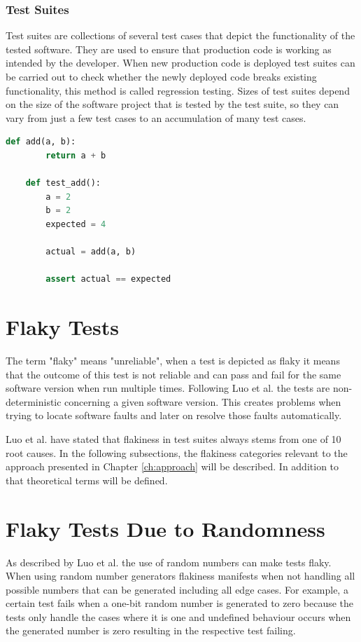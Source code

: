 \documentclass[
fancyheadings, %
%
%
]{stsreprt}
\begin{document}
\subsubsection{Test Suites}
Test suites are collections of several test cases that depict the functionality of the tested software. They are used to ensure that production code is working as intended by the developer. When new production code is deployed test suites can be carried out to check whether the newly deployed code breaks existing functionality, this method is called regression testing. Sizes of test suites depend on the size of the software project that is tested by the test suite, so they can vary from just a few test cases to an accumulation of many test cases.

\begin{lstlisting}[language=Python, caption={A simple function and its respective test case }, label=lst:simple_test]
    def add(a, b):
        return a + b

    def test_add():
        a = 2
        b = 2
        expected = 4

        actual = add(a, b)

        assert actual == expected
\end{lstlisting}

\section{Flaky Tests}
The term "flaky" means "unreliable", when a test is depicted as flaky it means that the outcome of this test is not reliable and can pass and fail for the same software version when run multiple times. 
Following Luo et al. \cite{luo:2014} the tests are non-deterministic concerning a given software version. 
This creates problems when trying to locate software faults and later on resolve those faults automatically. \par

Luo et al. \cite{luo:2014} have stated that flakiness in test suites always stems from one of 10 root causes. 
In the following subsections, the flakiness categories relevant to the approach presented in Chapter \ref{ch:approach} will be described. 
In addition to that theoretical terms will be defined. 

\section{Flaky Tests Due to Randomness}
As described by Luo et al. \cite{luo:2014} the use of random numbers can make tests flaky. When using random number generators flakiness manifests when not handling all possible numbers that can be generated including all edge cases. For example, a certain test fails when a one-bit random number is generated to zero because the tests only handle the cases where it is one and undefined behaviour occurs when the generated number is zero resulting in the respective test failing. 
\end{document}
